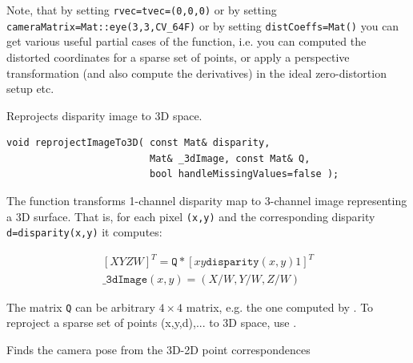 Note, that by setting \texttt{rvec=tvec=(0,0,0)} or by setting \texttt{cameraMatrix=Mat::eye(3,3,CV\_64F)} or by setting \texttt{distCoeffs=Mat()} you can get various useful partial cases of the function, i.e. you can computed the distorted coordinates for a sparse set of points, or apply a perspective transformation (and also compute the derivatives) in the ideal zero-distortion setup etc.

\label{reprojectImageTo3D}
Reprojects disparity image to 3D space.

\begin{lstlisting}
void reprojectImageTo3D( const Mat& disparity,
                         Mat& _3dImage, const Mat& Q,
                         bool handleMissingValues=false );
\end{lstlisting}
\begin{description}
\end{description}
 
The function transforms 1-channel disparity map to 3-channel image representing a 3D surface. That is, for each pixel \texttt{(x,y)} and the corresponding disparity \texttt{d=disparity(x,y)} it computes: 

\[\begin{array}{l}
[X Y Z W]^T = \texttt{Q}*[x y \texttt{disparity}(x,y) 1]^T \\
\texttt{\_3dImage}(x,y) = (X/W, Y/W, Z/W)
\end{array}\]

The matrix \texttt{Q} can be arbitrary $4 \times 4$ matrix, e.g. the one computed by . To reproject a sparse set of points {(x,y,d),...} to 3D space, use .  


\label{solvePnP}
Finds the camera pose from the 3D-2D point correspondences

